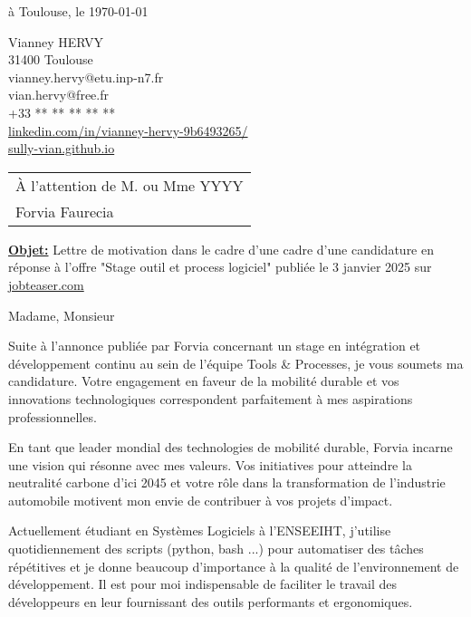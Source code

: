 \documentclass[a4paper,10pt]{article}
\begin{document}
\hfill à Toulouse, le \today

\noindent Vianney HERVY \\
31400 Toulouse \\
vianney.hervy@etu.inp-n7.fr \\
vian.hervy@free.fr \\
+33 ** ** ** ** ** \\
\href{https://www.linkedin.com/in/vianney-hervy-9b6493265/}{linkedin.com/in/vianney-hervy-9b6493265/} \\
\href{https://sully-vian.github.io}{sully-vian.github.io}

\hfill\begin{tabular}{l}
    À l'attention de M. ou Mme YYYY \\ %
    Forvia Faurecia
\end{tabular}

\vspace{5mm}
\noindent\textbf{\underline{Objet:}} Lettre de motivation dans le cadre d'une cadre d'une candidature en réponse à l'offre "Stage outil et process logiciel" publiée le 3 janvier 2025 sur \href{https://jobteaser.com}{jobteaser.com}

\vspace{5mm}
Madame, Monsieur

\vspace{2.5mm}
Suite à l'annonce publiée par Forvia concernant un stage en intégration et développement continu au sein de l'équipe Tools \& Processes, je vous soumets ma candidature. Votre engagement en faveur de la mobilité durable et vos innovations technologiques correspondent parfaitement à mes aspirations professionnelles.

\vspace{2.5mm}
En tant que leader mondial des technologies de mobilité durable, Forvia incarne une vision qui résonne avec mes valeurs. Vos initiatives pour atteindre la neutralité carbone d'ici 2045 et votre rôle dans la transformation de l'industrie automobile motivent mon envie de contribuer à vos projets d'impact.

\vspace{2.5mm}
Actuellement étudiant en Systèmes Logiciels à l'ENSEEIHT, j'utilise quotidiennement des scripts (python, bash ...) pour automatiser des tâches répétitives et je donne beaucoup d'importance à la qualité de l'environnement de développement. Il est pour moi indispensable de faciliter le travail des développeurs en leur fournissant des outils performants et ergonomiques.
\end{document}
